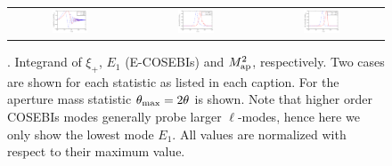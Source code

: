 \begin{figure}[htb]
\begin{center}
\begin{tabular}{ccc}
\includegraphics[width=0.31\textwidth]{figures/IntegKsip.pdf} &
\includegraphics[width=0.31\textwidth]{figures/IntegCOSEBIs.pdf} &
\includegraphics[width=0.31\textwidth]{figures/IntegMap.pdf}
\end{tabular}
\caption{ \label{fig:filters}. Integrand of $\xi_+$, $E_1$ (E-COSEBIs) and $M^2_{\rm ap}$, respectively.
Two cases are shown for each statistic as listed in each caption.
For the aperture mass statistic $\theta_{\rm max}=2\theta$ is shown. 
Note that higher order COSEBIs modes generally probe larger $\ell$-modes, hence here we only show the lowest mode $E_1$. All values are normalized with respect to their maximum value. 
}
\end{center}
\end{figure}


